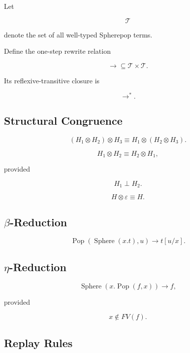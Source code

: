 \documentclass[12pt,oneside]{article}
\theoremstyle{definition}
\theoremstyle{remark}
\begin{document}
Let

\[
\mathcal T
\]

denote the set of all well-typed Spherepop terms.

Define the one-step rewrite relation

\[
\longrightarrow
\subseteq
\mathcal T
\times
\mathcal T.
\]

Its reflexive-transitive closure is

\[
\longrightarrow^{*}.
\]

\subsection*{Structural Congruence}

\[
(H_1\otimes H_2)\otimes H_3
\equiv
H_1\otimes(H_2\otimes H_3).
\]

\[
H_1\otimes H_2
\equiv
H_2\otimes H_1,
\]

provided

\[
H_1
\perp
H_2.
\]

\[
H\otimes\varepsilon
\equiv
H.
\]

\subsection*{$\beta$-Reduction}

\[
\operatorname{Pop}
(
\operatorname{Sphere}
(x.t),
u
)
\rightarrow
t[u/x].
\]

\subsection*{$\eta$-Reduction}

\[
\operatorname{Sphere}
(
x.
\operatorname{Pop}
(f,x)
)
\rightarrow
f,
\]

provided

\[
x
\notin
FV(f).
\]

\subsection*{Replay Rules}
\end{document}

